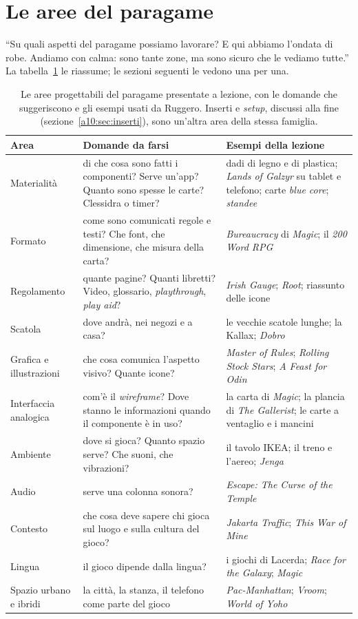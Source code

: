 \section{Le aree del paragame}
\label{a10:sec:aree}

``Su quali aspetti del paragame possiamo lavorare? E qui abbiamo l'ondata di robe.
Andiamo con calma: sono tante zone, ma sono sicuro che le vediamo tutte.'' La
tabella~\ref{a10:tab:aree} le riassume; le sezioni seguenti le vedono una per una.

\begin{table}[htbp]
\centering
\small
\begin{tabular}{@{}p{3.1cm}p{5.4cm}p{4.7cm}@{}}
\toprule
\textbf{Area} & \textbf{Domande da farsi} & \textbf{Esempi della lezione} \\
\midrule
Materialità & di che cosa sono fatti i componenti? Serve un'app? Quanto sono spesse
le carte? Clessidra o timer? & dadi di legno e di plastica; \emph{Lands of Galzyr} su
tablet e telefono; carte \emph{blue core}; \emph{standee} \\
Formato & come sono comunicati regole e testi? Che font, che dimensione, che misura
della carta? & \emph{Bureaucracy} di \emph{Magic}; il \emph{200 Word RPG} \\
Regolamento & quante pagine? Quanti libretti? Video, glossario, \emph{playthrough},
\emph{play aid}? & \emph{Irish Gauge}; \emph{Root}; riassunto delle icone \\
Scatola & dove andrà, nei negozi e a casa? & le vecchie scatole lunghe; la Kallax;
\emph{Dobro} \\
Grafica e illustrazioni & che cosa comunica l'aspetto visivo? Quante icone? &
\emph{Master of Rules}; \emph{Rolling Stock Stars}; \emph{A Feast for Odin} \\
Interfaccia analogica & com'è il \emph{wireframe}? Dove stanno le informazioni quando
il componente è in uso? & la carta di \emph{Magic}; la plancia di \emph{The
Gallerist}; le carte a ventaglio e i mancini \\
Ambiente & dove si gioca? Quanto spazio serve? Che suoni, che vibrazioni? & il tavolo
IKEA; il treno e l'aereo; \emph{Jenga} \\
Audio & serve una colonna sonora? & \emph{Escape: The Curse of the Temple} \\
Contesto & che cosa deve sapere chi gioca sul luogo e sulla cultura del gioco? &
\emph{Jakarta Traffic}; \emph{This War of Mine} \\
Lingua & il gioco dipende dalla lingua? & i giochi di Lacerda; \emph{Race for the
Galaxy}; \emph{Magic} \\
Spazio urbano e ibridi & la città, la stanza, il telefono come parte del gioco &
\emph{Pac-Manhattan}; \emph{Vroom}; \emph{World of Yoho} \\
\bottomrule
\end{tabular}
\caption{Le aree progettabili del paragame presentate a lezione, con le domande che
suggeriscono e gli esempi usati da Ruggero. Inserti e \emph{setup}, discussi alla fine
(sezione~\ref{a10:sec:inserti}), sono un'altra area della stessa famiglia.}
\label{a10:tab:aree}
\end{table}

